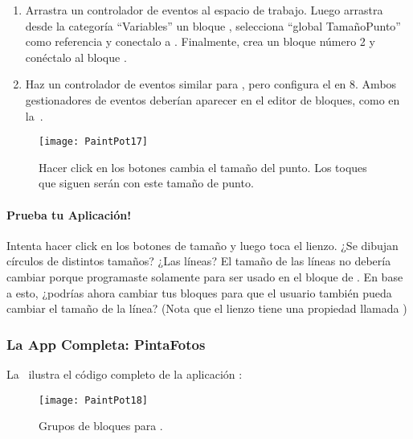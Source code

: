 \begin{enumerate}

\item Arrastra un controlador de eventos 
    al espacio de trabajo. Luego arrastra desde la categoría
    ``Variables'' un bloque , selecciona ``global
    TamañoPunto'' como referencia y conectalo a
    . Finalmente, crea un bloque número 2 y
    conéctalo al bloque .

\item Haz un controlador de eventos similar para
  , pero configura el  en 8. Ambos gestionadores de eventos
  deberían aparecer en el editor de bloques, como en la~.

\end{enumerate}

\begin{figure}[H]
\centering
\texttt{[image: PaintPot17]}
\caption{Hacer click en los botones cambia el tamaño del
punto. Los toques que siguen serán con este tamaño de punto.}
\label{fig:PaintPot17}
\end{figure}

\paragraph{Prueba tu Aplicación!} Intenta hacer click en los botones
de tamaño y luego toca el lienzo. ¿Se dibujan círculos de distintos
tamaños? ¿Las líneas? El tamaño de las líneas no debería cambiar
porque programaste  solamente para ser usado en
el bloque de . En base a esto, ¿podrías ahora
cambiar tus bloques para que el usuario también pueda cambiar el
tamaño de la línea? (Nota que el lienzo tiene una propiedad llamada
)

\subsubsection*{La App Completa: PintaFotos}

La~ ilustra el código completo de la aplicación :

\begin{figure}[H]
\centering
\texttt{[image: PaintPot18]}
\caption{Grupos de bloques para .}
\label{fig:PaintPot18}
\end{figure}



